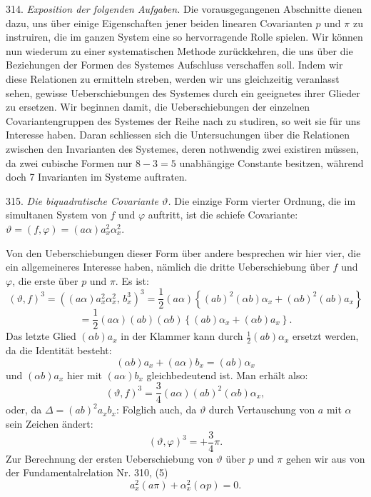 314. \textit{Exposition der folgenden Aufgaben.} Die vorausgegangenen Abschnitte dienen dazu, uns über einige Eigenschaften jener beiden linearen Covarianten $p$ und $\pi$ zu instruiren, die im ganzen System eine so hervorragende Rolle spielen. Wir können nun wiederum zu einer systematischen Methode zurückkehren, die uns über die Beziehungen der Formen des Systemes Aufschluss verschaffen soll. Indem wir diese Relationen zu ermitteln streben, werden wir uns gleichzeitig veranlasst sehen, gewisse Ueberschiebungen des Systemes durch ein geeignetes ihrer Glieder zu ersetzen. Wir beginnen damit, die Ueberschiebungen der einzelnen Covariantengruppen des Systemes der Reihe nach zu studiren, so weit sie für uns Interesse haben. Daran schliessen sich die Untersuchungen über die Relationen zwischen den Invarianten des Systemes, deren nothwendig zwei existiren müssen, da zwei cubische Formen nur $8-3=5$ unabhängige Constante besitzen, während doch 7 Invarianten im Systeme auftraten.

315. \textit{Die biquadratische Covariante $\vartheta$.} Die einzige Form vierter Ordnung, die im simultanen System von $f$ und $\varphi$ auftritt, ist die schiefe Covariante: $\vartheta = (f,\varphi) = (a\alpha)a_x^2\alpha_x^2$.

Von den Ueberschiebungen dieser Form über andere besprechen wir hier vier, die ein allgemeineres Interesse haben, nämlich die dritte Ueberschiebung über $f$ und $\varphi$, die erste über $p$ und $\pi$. Es ist:
\[
(\vartheta,f)^3 = \left((a\alpha)a_x^2\alpha_x^2,\, b_x^3\right)^3 = \frac{1}{2}(a\alpha)\left\{(ab)^2(\alpha b)\alpha_x + (\alpha b)^2(ab)a_x\right\}
\]
\[
= \frac{1}{2}(a\alpha)(ab)(\alpha b)\left\{(ab)\alpha_x + (\alpha b)a_x\right\}.
\]
Das letzte Glied $(\alpha b)a_x$ in der Klammer kann durch $\frac{1}{2}(ab)\alpha_x$ ersetzt werden, da die Identität besteht:
\[
(\alpha b)a_x + (a\alpha)b_x = (ab)\alpha_x
\]
und $(\alpha b)a_x$ hier mit $(a\alpha)b_x$ gleichbedeutend ist. Man erhält also:
\[
(\vartheta,f)^3 = \frac{3}{4}(a\alpha)(ab)^2(\alpha b)\alpha_x,
\]
oder, da $\Delta = (ab)^2a_xb_x$:
Folglich auch, da $\vartheta$ durch Vertauschung von $a$ mit $\alpha$ sein Zeichen ändert:
\[
(\vartheta,\varphi)^3 = +\frac{3}{4}\pi.
\]
Zur Berechnung der ersten Ueberschiebung von $\vartheta$ über $p$ und $\pi$ gehen wir aus von der Fundamentalrelation Nr. 310, (5)
\[
a_x^2(a\pi) + \alpha_x^2(\alpha p) = 0.
\]


